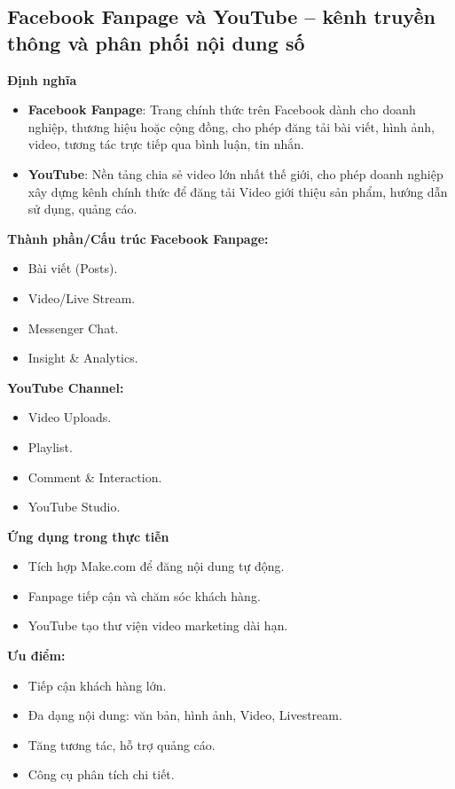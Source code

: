 
\subsection{Facebook Fanpage và YouTube – kênh truyền thông và phân phối nội dung số}

\textbf{Định nghĩa}
\begin{itemize}
    \item \textbf{Facebook Fanpage}: Trang chính thức trên Facebook dành cho doanh nghiệp, thương hiệu hoặc cộng đồng, cho phép đăng tải bài viết, hình ảnh, video, tương tác trực tiếp qua bình luận, tin nhắn.
    \item \textbf{YouTube}: Nền tảng chia sẻ video lớn nhất thế giới, cho phép doanh nghiệp xây dựng kênh chính thức để đăng tải Video giới thiệu sản phẩm, hướng dẫn sử dụng, quảng cáo.
\end{itemize}

\textbf{Thành phần/Cấu trúc}
\textbf{Facebook Fanpage:}
\begin{itemize}
    \item Bài viết (Posts).
    \item Video/Live Stream.
    \item Messenger Chat.
    \item Insight \& Analytics.
\end{itemize}

\textbf{YouTube Channel:}
\begin{itemize}
    \item Video Uploads.
    \item Playlist.
    \item Comment \& Interaction.
    \item YouTube Studio.
\end{itemize}

\textbf{Ứng dụng trong thực tiễn}
\begin{itemize}
    \item Tích hợp Make.com để đăng nội dung tự động.
    \item Fanpage tiếp cận và chăm sóc khách hàng.
    \item YouTube tạo thư viện video marketing dài hạn.
\end{itemize}


\textbf{Ưu điểm:}
\begin{itemize}
    \item Tiếp cận khách hàng lớn.
    \item Đa dạng nội dung: văn bản, hình ảnh, Video, Livestream.
    \item Tăng tương tác, hỗ trợ quảng cáo.
    \item Công cụ phân tích chi tiết.
\end{itemize}

